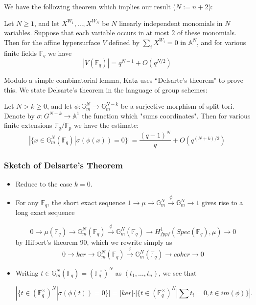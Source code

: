 \documentclass{beamer}
\begin{document}
\begin{frame}
We have the following theorem which implies our result ($N:=n+2$):
\begin{theorem}
Let $N\geq 1$, and let $X^{W_{1}},\ldots,X^{W_{N}}$ be $N$ linearly independent monomials in $N$ variables. Suppose that each variable occurs in at most $2$ of these monomials. Then for the affine hypersurface $V$ defined by $\sum_{i}X^{W_{i}} = 0$ in $\mathbb{A}^{N}$, and for various finite fields $\mathbb{F}_{q}$ we have 
$$|V(\mathbb{F}_{q})| = q^{N-1} + O(q^{N/2})$$
\end{theorem}
\pause
Modulo a simple combinatorial lemma, Katz uses ``Delsarte's theorem" to prove this. \pause We state Delsarte's theorem in the language of group schemes:\pause

\begin{theorem}
Let $N>k\geq 0$, and let $\phi:\mathbb{G}_{m}^{N}\rightarrow \mathbb{G}_{m}^{N-k}$ be a surjective morphism of split tori. Denote by $\sigma:G^{N-k} \rightarrow \mathbb{A}^{1}$ the function which "sums coordinates". Then for various finite extensions $\mathbb{F}_q/\mathbb{F}_p$ we have the estimate:
$$ |\{x\in \mathbb{G}_{m}^{N}(\mathbb{F}_q)|\sigma(\phi(x))=0\}| = \frac{(q-1)^{N}}{q} + O(q^{(N+k)/2})$$
\end{theorem}
\end{frame}

\begin{frame}
\frametitle{Sketch of Delsarte's Theorem}
\begin{itemize}
\item Reduce to the case $k=0$. 
\pause
\item For any $\mathbb{F}_{q}$, the short exact sequence
$1 \rightarrow \mu \rightarrow \mathbb{G}_{m}^{N} \xrightarrow{\phi} \mathbb{G}_{m}^{N} \rightarrow 1$
\noindent gives rise to a long exact sequence 

$$0 \rightarrow \mu(\mathbb{F}_{q}) \rightarrow \mathbb{G}_{m}^{N}(\mathbb{F}_q) \xrightarrow{\phi} \mathbb{G}_{m}^{N}(\mathbb{F}_q) \rightarrow H^{1}_{fppf}(Spec(\mathbb{F}_q),\mu) \rightarrow 0$$
\noindent by Hilbert's theorem 90, \pause which we rewrite simply as 
$$0 \rightarrow ker \rightarrow \mathbb{G}_{m}^{N}(\mathbb{F}_q) \xrightarrow{\phi} \mathbb{G}_{m}^{N}(\mathbb{F}_q) \rightarrow coker \rightarrow 0$$
\pause
\item Writing $t\in \mathbb{G}_{m}^{N}(\mathbb{F}_{q}) = (\mathbb{F}_{q}^{\times})^N$ as $(t_{1},\ldots,t_{n})$, we see that 
\begin{small}
$$|\{t\in (\mathbb{F}_{q}^{\times})^N|\sigma(\phi(t))=0\}| = |ker|\cdot|\{t\in (\mathbb{F}_{q}^{\times})^N|\sum t_{i} = 0, t\in im(\phi)\}|.$$
\end{small}
\end{itemize}
\end{frame}
\end{document}
